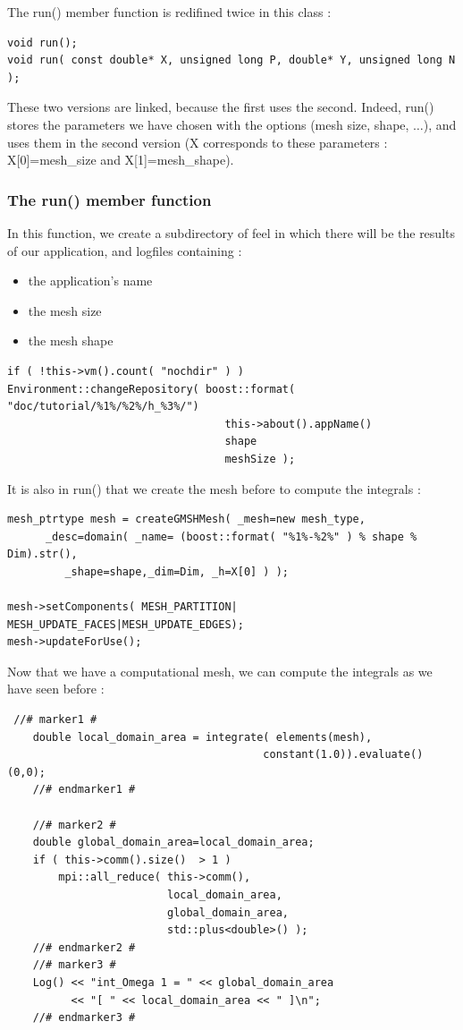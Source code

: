 The run() member function is redifined twice in this class :
\begin{lstlisting}
void run();
void run( const double* X, unsigned long P, double* Y, unsigned long N );
\end{lstlisting}

These two versions are linked, because the first uses the second. Indeed, run() stores the parameters we have chosen with the options (mesh size, shape, $\dots$), and uses them in the second version (X corresponds to these parameters : X[0]=mesh\_size and X[1]=mesh\_shape). \\

\subsubsection{The run() member function}
In this function, we create a subdirectory of feel in which there will be the results of our application, and logfiles containing :
\begin{itemize}
\item the application's name
\item the mesh size
\item the mesh shape
\end{itemize}

\begin{lstlisting}
if ( !this->vm().count( "nochdir" ) )
Environment::changeRepository( boost::format( "doc/tutorial/%1%/%2%/h_%3%/")
                                  this->about().appName()
                                  shape
                                  meshSize );

\end{lstlisting}
\vspace{0.2cm}
It is also in run() that we create the mesh before to compute the integrals :
\begin{lstlisting}
mesh_ptrtype mesh = createGMSHMesh( _mesh=new mesh_type,
      _desc=domain( _name= (boost::format( "%1%-%2%" ) % shape % Dim).str(),
         _shape=shape,_dim=Dim, _h=X[0] ) );

mesh->setComponents( MESH_PARTITION| MESH_UPDATE_FACES|MESH_UPDATE_EDGES);
mesh->updateForUse();

\end{lstlisting}
\vspace{0.2cm}
Now that we have a computational mesh, we can compute the integrals as we have seen before :

\begin{lstlisting}
 //# marker1 #
    double local_domain_area = integrate( elements(mesh),
                                        constant(1.0)).evaluate()(0,0);
    //# endmarker1 #

    //# marker2 #
    double global_domain_area=local_domain_area;
    if ( this->comm().size()  > 1 )
        mpi::all_reduce( this->comm(),
                         local_domain_area,
                         global_domain_area,
                         std::plus<double>() );
    //# endmarker2 #
    //# marker3 #
    Log() << "int_Omega 1 = " << global_domain_area
          << "[ " << local_domain_area << " ]\n";
    //# endmarker3 #

\end{lstlisting}

